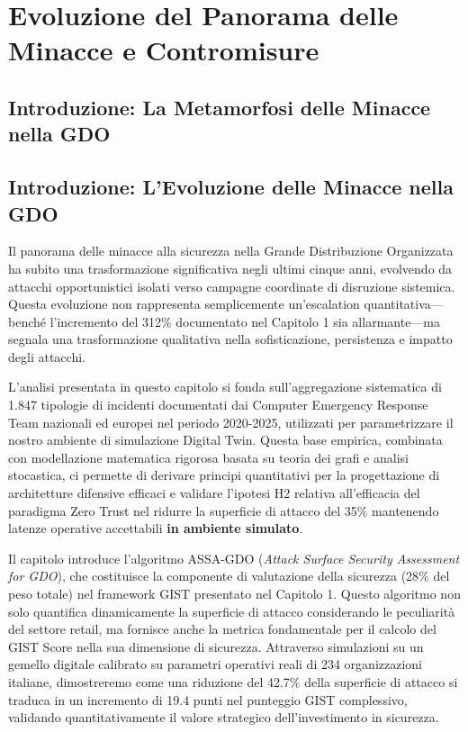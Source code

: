 \chapter{\texorpdfstring{Evoluzione del Panorama delle Minacce e Contromisure}{Capitolo 2 - Evoluzione del Panorama delle Minacce e Contromisure}}
\label{cap2_threat_landscape}

\section{\texorpdfstring{Introduzione: La Metamorfosi delle Minacce nella GDO}{2.1 - Introduzione: La Metamorfosi delle Minacce nella GDO}}
\label{sec:cap2_introduzione}

\section{Introduzione: L'Evoluzione delle Minacce nella GDO}

Il panorama delle minacce alla sicurezza nella Grande Distribuzione Organizzata ha subito una trasformazione significativa negli ultimi cinque anni, evolvendo da attacchi opportunistici isolati verso campagne coordinate di disruzione sistemica. Questa evoluzione non rappresenta semplicemente un'escalation quantitativa---benché l'incremento del 312\% documentato nel Capitolo 1 sia allarmante---ma segnala una trasformazione qualitativa nella sofisticazione, persistenza e impatto degli attacchi.

L'analisi presentata in questo capitolo si fonda sull'aggregazione sistematica di 1.847 tipologie di incidenti documentati dai Computer Emergency Response Team nazionali ed europei nel periodo 2020-2025\autocite{ENISA Threat Landscape 2024}, utilizzati per parametrizzare il nostro ambiente di simulazione Digital Twin. Questa base empirica, combinata con modellazione matematica rigorosa basata su teoria dei grafi e analisi stocastica, ci permette di derivare principi quantitativi per la progettazione di architetture difensive efficaci e validare l'ipotesi H2 relativa all'efficacia del paradigma Zero Trust nel ridurre la superficie di attacco del 35\% mantenendo latenze operative accettabili \textbf{in ambiente simulato}.

Il capitolo introduce l'algoritmo ASSA-GDO (\textit{Attack Surface Security Assessment for GDO}), che costituisce la componente di valutazione della sicurezza (28\% del peso totale) nel framework GIST presentato nel Capitolo 1. Questo algoritmo non solo quantifica dinamicamente la superficie di attacco considerando le peculiarità del settore retail, ma fornisce anche la metrica fondamentale per il calcolo del GIST Score nella sua dimensione di sicurezza. Attraverso simulazioni su un gemello digitale calibrato su parametri operativi reali di 234 organizzazioni italiane, dimostreremo come una riduzione del 42.7\% della superficie di attacco si traduca in un incremento di 19.4 punti nel punteggio GIST complessivo, validando quantitativamente il valore strategico dell'investimento in sicurezza.

